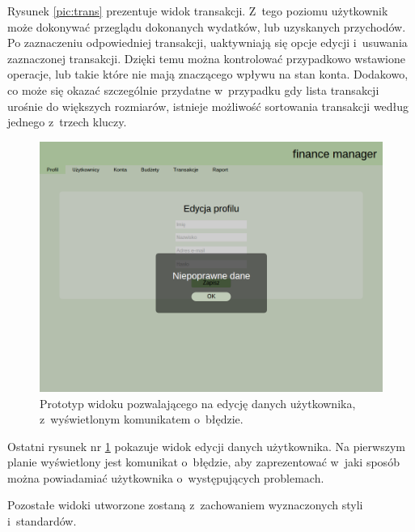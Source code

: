 Rysunek \ref{pic:trans} prezentuje widok transakcji. Z~tego poziomu użytkownik może dokonywać przeglądu dokonanych
wydatków, lub uzyskanych przychodów. Po zaznaczeniu odpowiedniej transakcji, uaktywniają się opcje edycji i~usuwania
zaznaczonej transakcji. Dzięki temu można kontrolować przypadkowo wstawione operacje, lub takie które nie mają
znaczącego wpływu na stan konta. Dodakowo, co może się okazać szczególnie przydatne w~przypadku gdy lista transakcji
urośnie do większych rozmiarów, istnieje możliwość sortowania transakcji według jednego z~trzech kluczy.

\begin{figure}[H]
  \centering
  \includegraphics[width=\textwidth]{images/ui-profile-edit-err.png}
  \caption{Prototyp widoku pozwalającego na edycję danych użytkownika, z~wyświetlonym komunikatem o~błędzie.}
  \label{pic:profile_edit}
\end{figure}

Ostatni rysunek  nr \ref{pic:profile_edit} pokazuje widok edycji danych użytkownika. Na pierwszym planie wyświetlony
jest komunikat o~błędzie, aby zaprezentować w~jaki sposób można powiadamiać użytkownika o~występujących problemach.

Pozostałe widoki utworzone zostaną z~zachowaniem wyznaczonych styli i~standardów.
